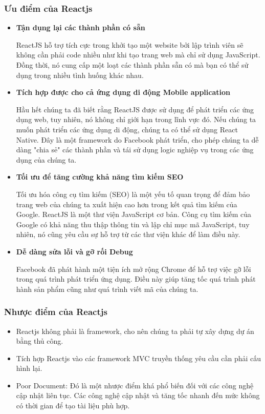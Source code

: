 \subsubsection{Ưu điểm của Reactjs}
\begin{itemize}
    \item \textbf{Tận dụng lại các thành phần có sẵn}

    \indent ReactJS hỗ trợ tích cực trong khởi tạo một website bởi lập trình viên sẽ không cần phải code nhiều như khi tạo trang web mà chỉ sử dụng JavaScript. Đồng thời, nó cung cấp một loạt các thành phần sẵn có mà bạn có thể sử dụng trong nhiều tình huống khác nhau.
    \item \textbf{Tích hợp được cho cả ứng dụng di động Mobile application}

    \indent Hầu hết chúng ta đã biết rằng ReactJS được sử dụng để phát triển các ứng dụng web, tuy nhiên, nó không chỉ giới hạn trong lĩnh vực đó. Nếu chúng ta muốn phát triển các ứng dụng di động, chúng ta có thể sử dụng React Native. Đây là một framework do Facebook phát triển, cho phép chúng ta dễ dàng "chia sẻ" các thành phần và tái sử dụng logic nghiệp vụ trong các ứng dụng của chúng ta.
    \item \textbf{Tối ưu để tăng cường khả năng tìm kiếm SEO}

    \indent Tối ưu hóa công cụ tìm kiếm (SEO) là một yếu tố quan trọng để đảm bảo trang web của chúng ta xuất hiện cao hơn trong kết quả tìm kiếm của Google. ReactJS là một thư viện JavaScript cơ bản. Công cụ tìm kiếm của Google có khả năng thu thập thông tin và lập chỉ mục mã JavaScript, tuy nhiên, nó cũng yêu cầu sự hỗ trợ từ các thư viện khác để làm điều này.
    \item \textbf{Dễ dàng sửa lỗi và gỡ rối Debug}

    \indent Facebook đã phát hành một tiện ích mở rộng Chrome để hỗ trợ việc gỡ lỗi trong quá trình phát triển ứng dụng. Điều này giúp tăng tốc quá trình phát hành sản phẩm cũng như quá trình viết mã của chúng ta.
\end{itemize}
\subsubsection{Nhược điểm của Reactjs}
\begin{itemize}
    \item Reactjs không phải là framework, cho nên chúng ta phải tự xây dựng dự án bằng thủ công.
    \item Tích hợp Reactjs vào các framework MVC truyền thống yêu cầu cần phải cấu hình lại.
    \item Poor Document: Đó là một nhược điểm khá phổ biến đối với các công nghệ cập nhật liên tục. Các công nghệ cập nhật và tăng tốc nhanh đến mức không có thời gian để tạo tài liệu phù hợp.
\end{itemize}

